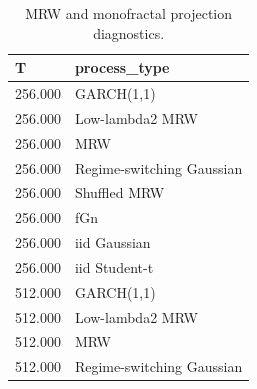 \begin{table}[t]
\centering
\caption{MRW and monofractal projection diagnostics.}
\label{tab:table2_mrw_mono_projection}
\begin{tabular}{ll}
\toprule
T & process\_type \\
\midrule
256.000 & GARCH(1,1) \\
256.000 & Low-lambda2 MRW \\
256.000 & MRW \\
256.000 & Regime-switching Gaussian \\
256.000 & Shuffled MRW \\
256.000 & fGn \\
256.000 & iid Gaussian \\
256.000 & iid Student-t \\
512.000 & GARCH(1,1) \\
512.000 & Low-lambda2 MRW \\
512.000 & MRW \\
512.000 & Regime-switching Gaussian \\
\bottomrule
\end{tabular}
\end{table}
